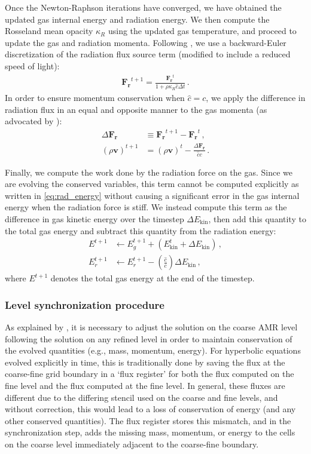 \documentclass[fleqn,usenatbib]{mnras}
\newcommand{\vc}[1]{{\mathbf{#1}}}
\begin{document}
Once the Newton-Raphson iterations have converged, we have obtained the updated gas internal energy and radiation energy. We then compute the Rosseland mean opacity $\kappa_R$ using the updated gas temperature, and proceed to update the gas and radiation momenta. Following \cite{Skinner_2019}, we use a backward-Euler discretization of the radiation flux source term (modified to include a reduced speed of light):
\begin{align}
\vc{F_r}^{t+1} = \frac{\vc{F_r}^t}{1 + \rho \kappa_R \hat c \Delta t} \, .
\end{align}
In order to ensure momentum conservation when $\hat c = c$, we apply the difference in radiation flux in an equal and opposite manner to the gas momenta (as advocated by \citealt{Skinner_2019}):
\begin{align}
\Delta \vc{F_r} &\equiv \vc{F_r}^{t+1} - \vc{F_r}^{t} \, , \\
{(\rho \vc{v})}^{t+1} &= {(\rho \vc{v})}^{t} - \frac{\Delta \vc{F_r}}{\hat c c} \, .
\end{align}

Finally, we compute the work done by the radiation force on the gas. Since we are evolving the conserved variables, this term cannot be computed explicitly as written in \autoref{eq:rad_energy} without causing a significant error in the gas internal energy when the radiation force is stiff. We instead compute this term as the difference in gas kinetic energy over the timestep $\Delta E_{\text{kin}}$, then add this quantity to the total gas energy and subtract this quantity from the radiation energy:
\begin{align}
E^{t+1} &\leftarrow E_g^{t+1} + \left( E_{\text{kin}}^t + \Delta E_{\text{kin}} \right) \, , \\
E_r^{t+1} &\leftarrow E_r^{t+1} - \left( \frac{\hat c}{c} \right) \Delta E_{\text{kin}} \, ,
\end{align}
where $E^{t+1}$ denotes the total gas energy at the end of the timestep.

\subsubsection{Level synchronization procedure}
\label{sssec:sync}

As explained by \cite{Berger:1989}, it is necessary to adjust the solution on the coarse AMR level following the solution on any refined level in order to maintain conservation of the evolved quantities (e.g., mass, momentum, energy). For hyperbolic equations evolved explicitly in time, this is traditionally done by saving the flux at the coarse-fine grid boundary in a `flux register' for both the flux computed on the fine level and the flux computed at the fine level. In general, these fluxes are different due to the differing stencil used on the coarse and fine levels, and without correction, this would lead to a loss of conservation of energy (and any other conserved quantities). The flux register stores this mismatch, and in the synchronization step, adds the missing mass, momentum, or energy to the cells on the coarse level immediately adjacent to the coarse-fine boundary.
\end{document}
